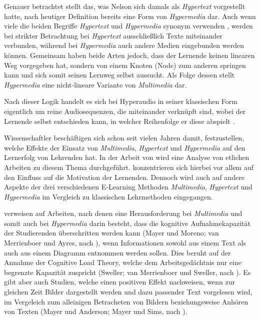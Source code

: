 Genauer betrachtet stellt das, was Nelson sich damals als \textit{Hypertext} vorgestellt hatte, nach heutiger Definition bereits eine Form von \textit{Hypermedia} dar. Auch wenn viele die beiden Begriffe \textit{Hypertext} und \textit{Hypermedia} synonym verwenden \citep{nielsen2013multimedia}, werden bei strikter Betrachtung bei \textit{Hypertext} ausschließlich Texte miteinander verbunden, während bei \textit{Hypermedia} auch andere Medien eingebunden werden können. Gemeinsam haben beide Arten jedoch, dass der Lernende keinen linearen Weg vorgegeben hat, sondern von einem Knoten (Node) zum anderen springen kann und sich somit seinen Lernweg selbst aussucht. Als Folge dessen stellt \textit{Hypermedia} eine nicht-lineare Variante von \textit{Multimedia} dar.

Nach dieser Logik handelt es sich bei Hyperaudio in seiner klassischen Form eigentlich um reine Audiosequenzen, die miteinander verknüpft sind, wobei der Lernende selbst entschieden kann, in welcher Reihenfolge er diese abspielt \citep{zumbach2006learning}.

Wissenschaftler beschäftigen sich schon seit vielen Jahren damit, festzustellen, welche Effekte der Einsatz von \textit{Multimedia}, \textit{Hypertext} und \textit{Hypermedia} auf den Lernerfolg von Lehrenden hat. In der Arbeit von \cite{moos2010multimedia} wird eine Analyse von etlichen Arbeiten zu diesem Thema durchgeführt. \cite{moos2010multimedia} konzentrieren sich hierbei vor allem auf den Einfluss auf die Motivation der Lernenden. Dennoch wird auch auf andere Aspekte der drei verschiedenen E-Learning Methoden \textit{Multimedia}, \textit{Hypertext} und  \textit{Hypermedia} im Vergleich zu klassischen Lehrmethoden eingegangen.

\cite{moos2010multimedia} verweisen auf Arbeiten, nach denen eine Herausforderung bei \textit{Multimedia} und somit auch bei \textit{Hypermedia} darin besteht, dass die kognitive Aufnahmekapazität der Studierenden überschritten werden kann (Mayer und Moreno; van Merrienboer und Ayres, nach \cite{moos2010multimedia}), wenn Informationen sowohl aus einem Text als auch aus einem Diagramm entnommen werden sollen. Dies beruht auf der Annahme der Cognitive Load Theory, welche dem Arbeitsgedächtnis nur eine begrenzte Kapazität zuspricht (Sweller; van Merrienboer und Sweller, nach \cite{moos2010multimedia}). Es gibt aber auch Studien, welche einen positiven Effekt nachweisen, wenn zur gleichen Zeit Bilder dargestellt werden und dazu passender Text vorgelesen wird, im Vergeleich zum alleinigen Betracheten von Bildern beziehungsweise Anhören von Texten (Mayer und Anderson; Mayer und Sims, nach \cite{moos2010multimedia}).

